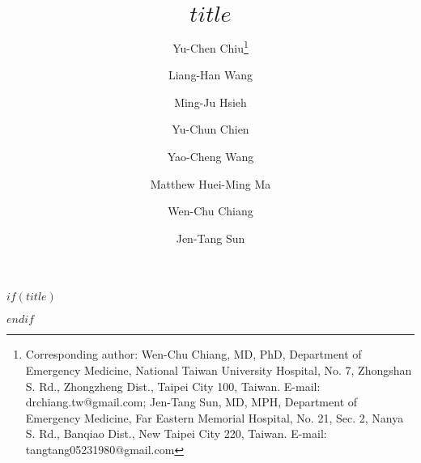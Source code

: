 \documentclass[
  20pt
]{article}
\date{} %
\makeatletter
\renewcommand{\thefootnote}{\fnsymbol{footnote}}
\newcommand\blfootnote[1]{%
  \begingroup
  \renewcommand\thefootnote{}\footnote{#1}%
  \addtocounter{footnote}{-1}%
  \endgroup
}
\renewcommand{\maketitle}{\bgroup\setlength{\parindent}{0pt}
\begin{flushleft}
    \begin{minipage}{14cm}
        \textbf{\Large\@title}
    \end{minipage}

    \vspace*{3pt}
        \@author
\end{flushleft}\egroup
}
\makeatother
\begin{document}

$if(title)$
\title{$title$}
$endif$
\author[1,\dagger]{Yu-Chen Chiu\footnote[0]{\textsuperscript{\ast}Corresponding author: Wen-Chu Chiang, MD, PhD, Department of Emergency Medicine, National Taiwan University Hospital, No. 7, Zhongshan S. Rd., Zhongzheng Dist., Taipei City 100, Taiwan. E-mail: drchiang.tw@gmail.com; Jen-Tang Sun, MD, MPH, Department of Emergency Medicine, Far Eastern Memorial Hospital, No. 21, Sec. 2, Nanya S. Rd., Banqiao Dist., New Taipei City 220, Taiwan. E-mail: tangtang05231980@gmail.com}}
\author[1,\dagger]{Liang-Han Wang}
\author[2]{Ming-Ju Hsieh}
\author[3]{Yu-Chun Chien}
\author[4]{Yao-Cheng Wang}

\author[2,5]{Matthew Huei-Ming Ma}
\author[2,5,\textsuperscript{\ast}]{Wen-Chu Chiang}
\author[1,\textsuperscript{\ast}]{Jen-Tang Sun}
        

\vspace*{5ex}


\maketitle
\thispagestyle{fancy} %

\vspace{1ex}
\end{document}
